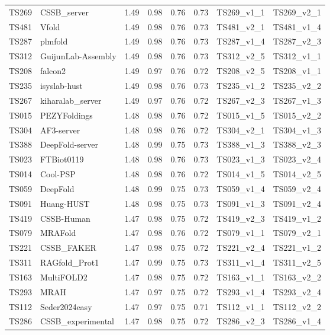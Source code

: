 \begin{table}[ht]
{\begin{tabular}{llllllll}
TS269 & CSSB\_server & 1.49 & 0.98 & 0.76 & 0.73 & TS269\_v1\_1 & TS269\_v2\_1 \\ 
TS481 & Vfold & 1.49 & 0.98 & 0.76 & 0.73 & TS481\_v2\_1 & TS481\_v1\_4 \\ 
TS287 & plmfold & 1.49 & 0.98 & 0.76 & 0.73 & TS287\_v1\_4 & TS287\_v2\_3 \\ 
TS312 & GuijunLab-Assembly & 1.49 & 0.98 & 0.76 & 0.73 & TS312\_v2\_5 & TS312\_v1\_1 \\ 
TS208 & falcon2 & 1.49 & 0.97 & 0.76 & 0.72 & TS208\_v2\_5 & TS208\_v1\_1 \\ 
TS235 & isyslab-hust & 1.49 & 0.98 & 0.76 & 0.73 & TS235\_v1\_2 & TS235\_v2\_2 \\ 
TS267 & kiharalab\_server & 1.49 & 0.97 & 0.76 & 0.72 & TS267\_v2\_3 & TS267\_v1\_3 \\ 
TS015 & PEZYFoldings & 1.48 & 0.98 & 0.76 & 0.72 & TS015\_v1\_5 & TS015\_v2\_2 \\ 
TS304 & AF3-server & 1.48 & 0.98 & 0.76 & 0.72 & TS304\_v2\_1 & TS304\_v1\_3 \\ 
TS388 & DeepFold-server & 1.48 & 0.99 & 0.75 & 0.73 & TS388\_v1\_3 & TS388\_v2\_3 \\ 
TS023 & FTBiot0119 & 1.48 & 0.98 & 0.76 & 0.73 & TS023\_v1\_3 & TS023\_v2\_4 \\ 
TS014 & Cool-PSP & 1.48 & 0.98 & 0.76 & 0.72 & TS014\_v1\_5 & TS014\_v2\_5 \\ 
TS059 & DeepFold & 1.48 & 0.99 & 0.75 & 0.73 & TS059\_v1\_4 & TS059\_v2\_4 \\ 
TS091 & Huang-HUST & 1.48 & 0.98 & 0.75 & 0.73 & TS091\_v1\_3 & TS091\_v2\_4 \\ 
TS419 & CSSB-Human & 1.47 & 0.98 & 0.75 & 0.72 & TS419\_v2\_3 & TS419\_v1\_2 \\ 
TS079 & MRAFold & 1.47 & 0.98 & 0.76 & 0.72 & TS079\_v1\_1 & TS079\_v2\_1 \\ 
TS221 & CSSB\_FAKER & 1.47 & 0.98 & 0.75 & 0.72 & TS221\_v2\_4 & TS221\_v1\_2 \\ 
TS311 & RAGfold\_Prot1 & 1.47 & 0.99 & 0.75 & 0.73 & TS311\_v1\_4 & TS311\_v2\_5 \\ 
TS163 & MultiFOLD2 & 1.47 & 0.98 & 0.75 & 0.72 & TS163\_v1\_1 & TS163\_v2\_2 \\ 
TS293 & MRAH & 1.47 & 0.97 & 0.75 & 0.72 & TS293\_v1\_4 & TS293\_v2\_4 \\ 
TS112 & Seder2024easy & 1.47 & 0.97 & 0.75 & 0.71 & TS112\_v1\_1 & TS112\_v2\_2 \\ 
TS286 & CSSB\_experimental & 1.47 & 0.98 & 0.75 & 0.72 & TS286\_v2\_3 & TS286\_v1\_4 \\ 

\end{tabular}}
\end{table}
